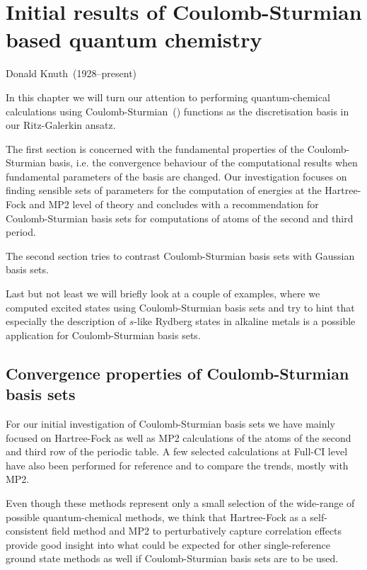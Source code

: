 \chapter[Coulomb-Sturmian based quantum chemistry]%
{Initial results of Coulomb-Sturmian based quantum chemistry}
\label{ch:CSQChem}
{Donald Knuth~(1928--present)}

In this chapter we will turn our attention to performing
quantum-chemical calculations using Coulomb-Sturmian~(\CS) functions
as the discretisation basis in our Ritz-Galerkin ansatz.

The first section is concerned with the fundamental properties
of the Coulomb-Sturmian basis,
i.e. the convergence behaviour of the computational results
when fundamental parameters of the basis are changed.
Our investigation focuses on finding sensible sets of parameters
for the computation of energies at the Hartree-Fock and MP2 level of theory
and concludes with a recommendation for Coulomb-Sturmian basis
sets for computations of atoms of the second and third period.

The second section tries to contrast Coulomb-Sturmian basis sets
with Gaussian basis sets.

Last but not least we will briefly look at a couple of examples,
where we computed excited states using Coulomb-Sturmian basis sets
and try to hint that especially the description of $s$-like
Rydberg states in alkaline metals is a possible application
for Coulomb-Sturmian basis sets.

\section{Convergence properties of Coulomb-Sturmian basis sets}
For our initial investigation of Coulomb-Sturmian basis sets
we have mainly focused on Hartree-Fock as well as MP2
calculations of the atoms of the second and third
row of the periodic table.
A few selected calculations at Full-CI level have also
been performed for reference and to compare the trends,
mostly with MP2.

Even though these methods represent only a small selection
of the wide-range of possible quantum-chemical methods,
we think that Hartree-Fock as a self-consistent field method
and MP2 to perturbatively capture correlation effects
provide good insight into what could be expected
for other single-reference ground state methods as well
if Coulomb-Sturmian basis sets are to be used.

